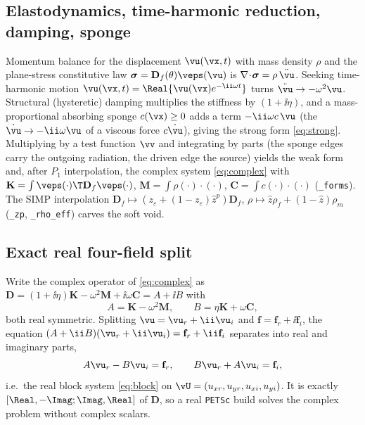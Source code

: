 \documentclass[11pt]{article}
\begin{document}
\subsection{Elastodynamics, time-harmonic reduction, damping, sponge}
Momentum balance for the displacement $\vu(\vx,t)$ with mass density $\rho$ and
the plane-stress constitutive law $\bm\sigma=\mathbf D_f(\theta)\veps(\vu)$ is
$\nabla\!\cdot\!\bm\sigma=\rho\,\ddot{\vu}$. Seeking time-harmonic motion
$\vu(\vx,t)=\Real\{\vu(\vx)e^{-\ii\omega t}\}$ turns $\ddot{\vu}\to-\omega^2\vu$.
Structural (hysteretic) damping multiplies the stiffness by $(1+\ii\eta)$, and a
mass-proportional absorbing sponge $c(\vx)\ge0$ adds a term $-\ii\omega c\,\vu$
(the $\dot{\vu}\to-\ii\omega\vu$ of a viscous force $c\dot\vu$), giving the strong
form \eqref{eq:strong}. Multiplying by a test function $\vv$ and integrating by
parts (the sponge edges carry the outgoing radiation, the driven edge the source)
yields the weak form and, after $P_1$ interpolation, the complex system
\eqref{eq:complex} with
$\mathbf K=\int\veps(\cdot)\T\mathbf D_f\veps(\cdot)$,
$\mathbf M=\int\rho(\cdot)\!\cdot\!(\cdot)$,
$\mathbf C=\int c(\cdot)\!\cdot\!(\cdot)$ (\texttt{\_forms}). The SIMP
interpolation $\mathbf D_f\!\mapsto\!(z_\varepsilon+(1-z_\varepsilon)\hat z^p)
\mathbf D_f$, $\rho\!\mapsto\!\hat z\rho_f+(1-\hat z)\rho_m$ (\texttt{\_zp},
\texttt{\_rho\_eff}) carves the soft void.

\subsection{Exact real four-field split}
Write the complex operator of \eqref{eq:complex} as
$\mathbf D=(1+\ii\eta)\mathbf K-\omega^2\mathbf M+\ii\omega\mathbf C=A+\ii B$ with
\begin{equation}
  A=\mathbf K-\omega^2\mathbf M,\qquad B=\eta\mathbf K+\omega\mathbf C,
\end{equation}
both real symmetric. Splitting $\vu=\vu_r+\ii\vu_i$ and $\mathbf f=\mathbf
f_r+\ii\mathbf f_i$, the equation $(A+\ii B)(\vu_r+\ii\vu_i)=\mathbf f_r+\ii\mathbf
f_i$ separates into real and imaginary parts,
\begin{equation}
  A\vu_r-B\vu_i=\mathbf f_r,\qquad B\vu_r+A\vu_i=\mathbf f_i,
\end{equation}
i.e.\ the real block system \eqref{eq:block} on
$\vU=(u_{xr},u_{yr},u_{xi},u_{yi})$. It is exactly $[\Real,-\Imag;\Imag,\Real]$ of
$\mathbf D$, so a real \texttt{PETSc} build solves the complex problem without
complex scalars.
\end{document}
